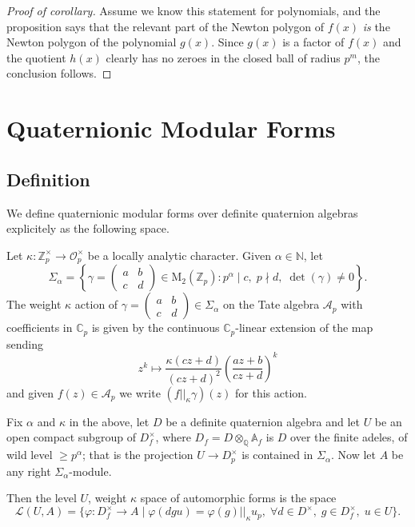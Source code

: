 \begin{proof}[Proof of corollary]
    Assume we know this statement for polynomials, and the proposition says that the relevant
    part of the Newton polygon of $f(x)$ \emph{is} the Newton polygon of the polynomial $g(x)$.
    Since $g(x)$ is a factor of $f(x)$ and the quotient $h(x)$ clearly has no zeroes in the closed
    ball of radius $p^m$, the conclusion follows.
\end{proof}


\chapter{Quaternionic Modular Forms}

\section{Definition}

We define quaternionic modular forms over definite quaternion algebras explicitely as the following
space.

\begin{definition}
  Let $\kappa : \mathbb{Z}_p^\times \to \mathcal{O}_p^\times$ be a locally analytic character.
  Given $\alpha \in \mathbb{N}$, let
  \[
    \Sigma_\alpha = \left\{ \gamma =  \begin{pmatrix}
      a & b \\
      c & d
    \end{pmatrix}
    \in \text{M}_2(\mathbb{Z}_p) : p^\alpha \mid c, \; p \nmid d, \; \det (\gamma) \neq 0 \right\}.
  \]
  The weight $\kappa$ action of $\gamma =  \begin{pmatrix} a & b \\ c & d \end{pmatrix} \in
  \Sigma_\alpha$ on the Tate algebra $\mathcal{A}_p$ with coefficients in $\mathbb{C}_p$ is given by
  the continuous $\mathbb{C}_p$-linear extension of the map sending
  \[
    z^k \mapsto \frac{\kappa(c z + d)}{(cz + d)^2} \left( \frac{az+b}{cz+d} \right)^k
  \]
  and given $f(z) \in \mathcal{A}_p$ we write $(f||_\kappa \gamma)(z)$ for this action.

  Fix $\alpha$ and $\kappa$ in the above, let $D$ be a definite quaternion algebra and let $U$ be
  an open compact subgroup of $D_f^\times$, where $D_f = D  \otimes_{\mathbb{Q}} \mathbb{A}_f$ is
  $D$ over the finite adeles, of wild level $\geq p^\alpha$; that is the projection
  $U \to D_{p}^\times$ is contained in $\Sigma_\alpha.$
  Now let $A$ be any right $\Sigma_\alpha$-module.

  Then the level $U$, weight $\kappa$ space of automorphic forms is the space
  \[
    \mathcal{L}(U,A) = \{ \varphi : D_f^\times \to A  \;  | \; \varphi (dgu) = \varphi (g)
    ||_\kappa u_p, \; \forall d \in D^\times, \; g \in D^\times_f, \; u \in U \}.
  \]
\end{definition}

